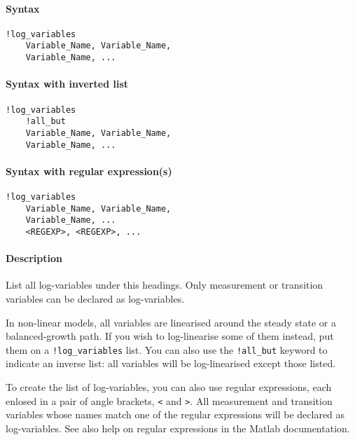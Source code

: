 


	\paragraph{Syntax}

\begin{verbatim}
!log_variables
    Variable_Name, Variable_Name, 
    Variable_Name, ...
\end{verbatim}

\paragraph{Syntax with inverted list}

\begin{verbatim}
!log_variables
    !all_but
    Variable_Name, Variable_Name, 
    Variable_Name, ...
\end{verbatim}

\paragraph{Syntax with regular
expression(s)}

\begin{verbatim}
!log_variables
    Variable_Name, Variable_Name, 
    Variable_Name, ...
    <REGEXP>, <REGEXP>, ...
\end{verbatim}

\paragraph{Description}

List all log-variables under this headings. Only measurement or
transition variables can be declared as log-variables.

In non-linear models, all variables are linearised around the steady
state or a balanced-growth path. If you wish to log-linearise some of
them instead, put them on a \texttt{!log\_variables} list. You can also
use the \texttt{!all\_but} keyword to indicate an inverse list: all
variables will be log-linearised except those listed.

To create the list of log-variables, you can also use regular
expressions, each enlosed in a pair of angle brackets,
\texttt{\textless{}} and \texttt{\textgreater{}}. All measurement and
transition variables whose names match one of the regular expressions
will be declared as log-variables. See also help on regular expressions
in the Matlab documentation.

